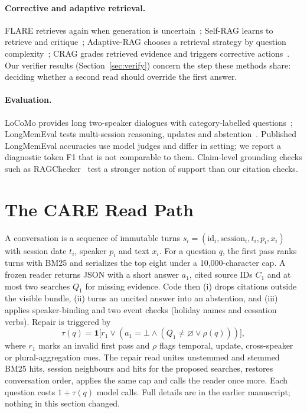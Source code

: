 \documentclass[11pt]{article}
\newcommand{\care}{\textsc{CARE}}
\begin{document}
\paragraph{Corrective and adaptive retrieval.}
FLARE retrieves again when generation is uncertain~\cite{jiang2023active};
Self-RAG learns to retrieve and critique~\cite{asai2023selfrag}; Adaptive-RAG
chooses a retrieval strategy by question complexity~\cite{jeong2024adaptive};
CRAG grades retrieved evidence and triggers corrective actions~\cite{yan2024crag}.
Our verifier results (Section~\ref{sec:verify}) concern the step these methods
share: deciding whether a second read should override the first answer.

\paragraph{Evaluation.}
LoCoMo provides long two-speaker dialogues with category-labelled
questions~\cite{maharana2024locomo}; LongMemEval tests multi-session
reasoning, updates and abstention~\cite{wu2024longmemeval}. Published
LongMemEval accuracies use model judges and differ in setting; we report a
diagnostic token F1 that is not comparable to them. Claim-level grounding
checks such as RAGChecker~\cite{ru2024ragchecker} test a stronger notion of
support than our citation checks.

\section{The \care{} Read Path}
\label{sec:care}

A conversation is a sequence of immutable turns
$s_i=(\mathrm{id}_i,\mathrm{session}_i,t_i,p_i,x_i)$ with session date $t_i$,
speaker $p_i$ and text $x_i$. For a question $q$, the first pass ranks turns
with BM25 and serializes the top eight under a 10,000-character cap. A frozen
reader returns JSON with a short answer $a_1$, cited source IDs $C_1$ and at
most two searches $Q_1$ for missing evidence. Code then (i) drops citations
outside the visible bundle, (ii) turns an uncited answer into an abstention,
and (iii) applies speaker-binding and two event checks (holiday names and
cessation verbs). Repair is triggered by
\begin{equation}
\tau(q)=\mathbf{1}\bigl[r_1 \lor (a_1=\bot \land (Q_1\neq\varnothing \lor \rho(q)))\bigr],
\label{eq:gate}
\end{equation}
where $r_1$ marks an invalid first pass and $\rho$ flags temporal, update,
cross-speaker or plural-aggregation cues. The repair read unites unstemmed and
stemmed BM25 hits, session neighbours and hits for the proposed searches,
restores conversation order, applies the same cap and calls the reader once
more. Each question costs $1+\tau(q)$ model calls. Full details are in the
earlier manuscript; nothing in this section changed.
\end{document}
